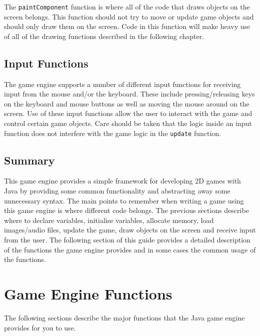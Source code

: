 \documentclass[a4paper, 10pt]{report}
\begin{document}
The {\tt paintComponent} function is where all of the code that draws objects on the screen belongs. This function should not try to move or update game objects and should only draw them on the screen. Code in this function will make heavy use of all of the drawing functions described in the following chapter.

\section*{Input Functions} \nonumber

The game engine supports a number of different input functions for receiving input from the mouse and/or the keyboard. These include pressing/releasing keys on the keyboard and mouse buttons as well as moving the mouse around on the screen. Use of these input functions allow the user to interact with the game and control certain game objects. Care should be taken that the logic inside an input function does not interfere with the game logic in the {\tt update} function.

\section*{Summary} \nonumber

This game engine provides a simple framework for developing 2D games with Java by providing some common functionality and abstracting away some unnecessary syntax. The main points to remember when writing a game using this game engine is where different code belongs. The previous sections describe where to declare variables, initialise variables, allocate memory, load images/audio files, update the game, draw objects on the screen and receive input from the user. The following section of this guide provides a detailed description of the functions the game engine provides and in some cases the common usage of the functions.



\chapter{Game Engine Functions}

The following sections describe the major functions that the Java game engine provides for you to use.
\end{document}
